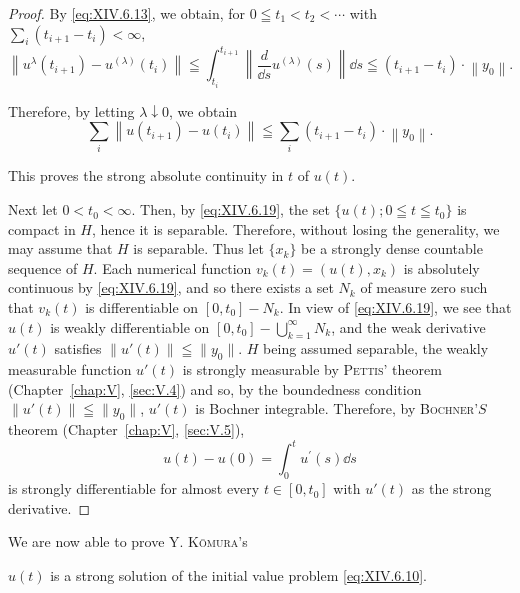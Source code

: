 \begin{proof}
 By \eqref{eq:XIV.6.13}, we obtain, for $0 \leqq t_{1} < t_{2} < \cdots$ with $\sum\limits_{i} (t_{i+1} - t_{i}) < \infty$, 
\[
\left\| u ^{\lambda} \left(t _{i+1}\right) - u ^{(\lambda)} \left(t _{i}\right) \right\| \leqq \int_ {t _{i}} ^ {t _{i+1}} \left\| \frac {d}{\dd s} u ^{(\lambda)} (s) \right\| \dd s \leqq \left(t _{i+1} - t _{i}\right) \cdot \left\| y _{0} \right\|. \]

Therefore, by letting $\lambda \downarrow 0$, we obtain 
\begin{equation}\label{eq:XIV.6.19}
\sum\limits_{i} \left\| u \left(t _{i+1}\right) - u \left(t _{i}\right) \right\| \leqq \sum\limits_{i} \left(t _{i+1} - t _{i}\right) \cdot \left\| y _{0} \right\|.
\end{equation}

This proves the strong absolute continuity in $t$ of $u(t)$. 

Next let $0 < t_0 < \infty$. Then, by \eqref{eq:XIV.6.19}, the set $\{u(t); 0 \leqq t \leqq t_0\}$ is compact in $H$, hence it is separable. Therefore, without losing the generality, we may assume that $H$ is separable. Thus let $\{x_k\}$ be a strongly dense countable sequence of $H$. Each numerical function $v_k(t) = (u(t), x_k)$ is absolutely continuous by \eqref{eq:XIV.6.19}, and so there exists a set $N_k$ of measure zero such that $v_k(t)$ is differentiable on $[0, t_0] - N_k$. In view of \eqref{eq:XIV.6.19}, we see that $u(t)$ is weakly differentiable on $[0, t_0] - \bigcup\limits_{k=1}^{\infty} N_k$, and the weak derivative $u'(t)$ satisfies $\|u'(t)\| \leqq \|y_0\|$. $H$ being assumed separable, the weakly measurable function $u'(t)$ is strongly measurable by \textsc{Pettis}' theorem (Chapter~\ref{chap:V}, \ref{sec:V.4}) and so, by the boundedness condition $\|u'(t)\| \leqq \|y_0\|$, $u'(t)$ is Bochner integrable. Therefore, by \textsc{Bochner}'$S$ theorem (Chapter~\ref{chap:V}, \ref{sec:V.5}), 
\begin{equation}\label{eq:XIV.6.20}
u (t) - u (0) = \int_{0} ^{t} u ^{\prime} (s) \dd s
\end{equation}
is strongly differentiable for almost every $t \in [0, t_0]$ with $u'(t)$ as the strong derivative. 
\end{proof}
We are now able to prove Y. \textsc{Kōmura}'s 

\begin{theoremu} $u(t)$ is a strong solution of the initial value problem \eqref{eq:XIV.6.10}. 
\end{theoremu}

